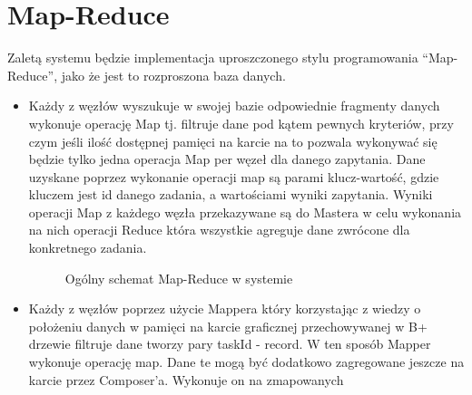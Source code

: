\documentclass[paper=a4, fontsize=11pt]{scrartcl} %
\numberwithin{equation}{section} %
\numberwithin{figure}{section} %
\numberwithin{table}{section} %
\begin{document}
\section{Map-Reduce}
Zaletą systemu będzie implementacja uproszczonego stylu programowania ``Map-Reduce'', jako że jest to rozproszona baza danych.
\begin{itemize}
	\item Każdy z węzłów wyszukuje w swojej bazie odpowiednie fragmenty danych wykonuje operację Map tj. filtruje dane pod kątem pewnych 
		kryteriów, przy czym jeśli ilość dostępnej pamięci na karcie na to pozwala wykonywać się będzie tylko jedna operacja Map per węzeł dla danego zapytania.
		Dane uzyskane poprzez wykonanie operacji map są parami klucz-wartość, gdzie kluczem jest id danego zadania, a wartościami wyniki zapytania. Wyniki
		operacji Map z każdego węzła przekazywane są do Mastera w celu wykonania na nich operacji Reduce która wszystkie agreguje dane zwrócone dla konkretnego zadania. 
		\begin{figure}[t]
			\begin{center}
				\caption{Ogólny schemat Map-Reduce w systemie}
			\end{center}
		\end{figure}
	\item Każdy z węzłów poprzez użycie Mappera który korzystając z wiedzy o położeniu danych w pamięci na karcie graficznej przechowywanej w B+ drzewie filtruje dane tworzy
		pary taskId - record. W ten sposób Mapper wykonuje operację map. Dane te mogą być dodatkowo zagregowane jeszcze na karcie przez Composer'a. Wykonuje on na zmapowanych

\end{itemize}
\end{document}
